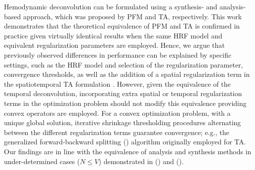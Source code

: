 Hemodynamic deconvolution can be formulated using a synthesis- and analysis-based approach, which was proposed by PFM and TA, respectively. This work demonstrates that the theoretical equivalence of PFM and TA is confirmed in practice given virtually identical results when the same HRF model and equivalent regularization parameters are employed. Hence, we argue that previously observed differences in performance can be explained by specific settings, such as the HRF model and selection of the regularization parameter, convergence thresholds, as well as the addition of a spatial regularization term in the spatiotemporal TA formulation \citealt{Karahanoglu2013TotalactivationfMRI}. However, given the equivalence of the temporal deconvolution, incorporating extra spatial or temporal regularization terms in the optimization problem should not modify this equivalence providing convex operators are employed. For a convex optimization problem, with a unique global solution, iterative shrinkage thresholding procedures alternating between the different regularization terms guarantee convergence; e.g., the generalized forward-backward splitting (\citealt{Raguet2013GeneralizedForwardBackward}) algorithm originally employed for TA. Our findings are in line with the equivalence of analysis and synthesis methods in under-determined cases (\(N \leq V\)) demonstrated in (\citealt{Elad2007Analysisversussynthesis}) and (\citealt{ortelli2019synthesis}).

